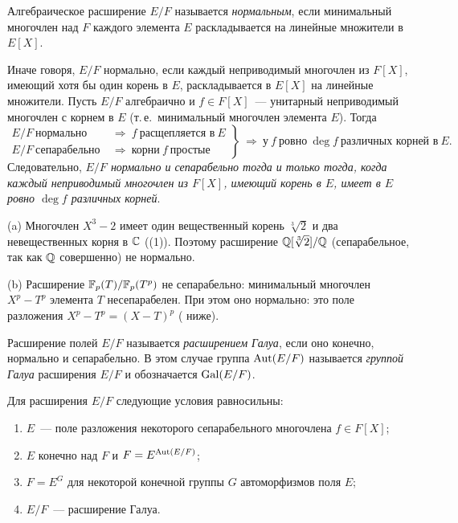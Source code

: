 \begin{definition}[3.7]
Алгебраическое расширение $E/F$ называется \emph{нормальным}, если минимальный многочлен над $F$ каждого элемента $E$
раскладывается на линейные множители в $E[X]$.
\end{definition}

Иначе говоря, $E/F$ нормально, если каждый неприводимый многочлен из $F[X]$, имеющий хотя бы один корень в $E$,
раскладывается в $E[X]$ на линейные множители. Пусть $E/F$ алгебраично и $f\in F[X]$~--- унитарный неприводимый многочлен
с корнем в $E$ (т.\,е.\ минимальный многочлен элемента $E$). Тогда
\[
\left.\begin{aligned}
E/F\ \text{нормально}\ &\Rightarrow\ f\ \text{расщепляется в}\ E\\
E/F\ \text{сепарабельно}\ &\Rightarrow\ \text{корни}\ f\ \text{простые}
\end{aligned}\right\}\ \Rightarrow\ \text{у}\ f\ \text{ровно}\ \deg f\ \text{различных корней в}\ E.
\]
Следовательно, \emph{$E/F$ нормально и сепарабельно тогда и только тогда, когда каждый неприводимый многочлен из
$F[X]$, имеющий корень в $E$, имеет в $E$ ровно $\deg f$ различных корней}.

\begin{example}[3.8]
(a) Многочлен $X^3-2$ имеет один вещественный корень $\sqrt[3]2$ и два невещественных корня в $\mathbb C$
((1)). Поэтому расширение $\mathbb Q[\sqrt[3]2]/\mathbb Q$ (сепарабельное, так как $\mathbb Q$ совершенно) не нормально.

(b) Расширение $\mathbb F_p(T)/\mathbb F_p(T^p)$ не сепарабельно: минимальный многочлен $X^p-T^p$ элемента $T$ несепарабелен. При этом
оно нормально: это поле разложения $X^p-T^p=(X-T)^p$ ( ниже).
\end{example}

\begin{definition}[3.9]
Расширение полей $E/F$ называется \emph{расширением Галуа}, если оно конечно, нормально и сепарабельно. В этом случае
группа $\operatorname{Aut}(E/F)$ называется \emph{группой Галуа} расширения $E/F$ и обозначается $\operatorname{Gal}(E/F)$.
\end{definition}

\begin{theorem}[3.10]
Для расширения $E/F$ следующие условия равносильны:
\begin{enumerate}[label=\textup{(\alph*)}]
\item $E$~--- поле разложения некоторого сепарабельного многочлена $f\in F[X]$;
\item $E$ конечно над $F$ и $F=E^{\operatorname{Aut}(E/F)}$;
\item $F=E^G$ для некоторой конечной группы $G$ автоморфизмов поля $E$;
\item $E/F$~--- расширение Галуа.
\end{enumerate}
\end{theorem}

